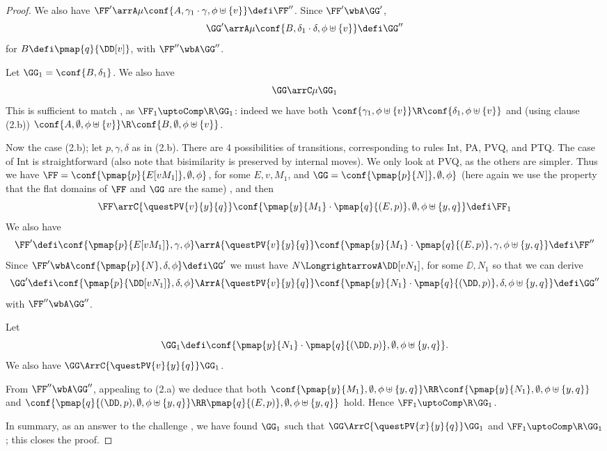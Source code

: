 \begin{proof}
We also have 
$ \FF' \arrA  \mu \conf{A,  \gamma_1 \cdot \gamma  ,\phi\uplus \{v\}} \defi \FF''$. 
Since $\FF' \wbA \GG'$, 
\[ \GG'  \arrA  \mu \conf{B,  \delta_1 \cdot \delta  ,\phi \uplus \{v\}}  \defi \GG''\] 
for 
$B \defi \pmap{q}{\DD[v]}$, 
with $\FF'' \wbA \GG''$.

Let $\GG_1 =   \conf{B, \delta_1}$.
We also have 
\[ \GG \arrC  \mu \GG_1 \] 
This is sufficient to match , as 
$\FF_1 \uptoComp \R  \GG_1$: indeed we have  
both $\conf{ \gamma_1,\phi\uplus \{v\}} \R  \conf{ \delta_1,\phi\uplus \{v\}}$ and  
(using clause (2.b))
$\conf{ A, \emptyset , \phi\uplus \{v\}} \R  \conf{ B, \emptyset, \phi\uplus \{v\}}$.



Now the case (2.b);  let $p,  \gamma , \delta $ as in (2.b).
 There are 4 possibilities of transitions, corresponding to rules 
Int, PA, PVQ, and PTQ. The case of 
Int  is straightforward (also note that bisimilarity is preserved by internal
moves).  We only look at PVQ, as the others are simpler. 
Thus we have 
$\FF = \conf{\pmap{p}{E[v M_1]},\emptyset ,\phi }$, for some $E,v,M_1$,
and
$\GG = \conf{\pmap{p}{N]},\emptyset ,\phi }$
 (here again we use the property that  the flat domains of $\FF$ and
$\GG$ are the same) , 
 and then 
\begin{equation}
\label{e:CBNKpqH}
\FF  \arrC{\questPV{v}{y}{q}}
     \conf{ \pmap{y}{M_1}\cdot \pmap{q}{(E,p)},\emptyset , \phi\uplus\{y,q\}}  \defi \FF_1
 \end{equation} 
 We also have  
\[
\FF' \defi \conf{\pmap{p}{E[v M_1]}, \gamma,\phi }  
 \arrA{\questPV{v}{y}{q}}
     \conf{ \pmap{y}{M_1}\cdot \pmap{q}{(E,p)},\gamma, \phi\uplus\{y,q\}} 
\defi \FF''\]
Since 
$\FF' 
\wbA 
\conf{\pmap{p}{N}, \delta,\phi  } \defi \GG' $ 
we must have $N \LongrightarrowA  \DD[v N_1]$, for some $\DD,N_1$ so that 
we  can derive
\[
\GG' \defi \conf{\pmap{p}{\DD[v N_1]}, \delta,\phi }  
 \ArrA{\questPV{v}{y}{q}}
     \conf{ \pmap{y}{N_1}\cdot \pmap{q}{(\DD,p)},\delta, \phi\uplus\{y,q\}} 
\defi \GG''\]
with 
$\FF'' \wbA \GG''$. 

Let $$
\GG_1 \defi      \conf{ \pmap{y}{N_1}\cdot \pmap{q}{(\DD,p)},\emptyset , \phi\uplus\{y,q\}} 
.$$
We also have $\GG \ArrC
{\questPV{v}{y}{q}}
 \GG_1$. 

From $\FF'' \wbA \GG''$, appealing to (2.a)  we deduce that both 
$     \conf{ \pmap{y}{M_1},\emptyset , \phi\uplus\{y,q\}} \RR
     \conf{ \pmap{y}{N_1},\emptyset , \phi\uplus\{y,q\}}$ 
and 
$
     \conf{ \pmap{q}{(\DD,p),\emptyset , \phi\uplus\{y,q\}} 
 \RR
\pmap{q}{(E,p)},\emptyset , \phi\uplus\{y,q\}}$ hold.
Hence $\FF_1 \uptoComp \R  \GG_1$.

In summary, as an answer to the challenge 
, we have found  $\GG_1$ such that 
 $\GG \ArrC
{\questPV{x}{y}{q}}
 \GG_1$ and  
$\FF  _1 \uptoComp \R  \GG_1$; this closes the proof.
  \end{proof} 


